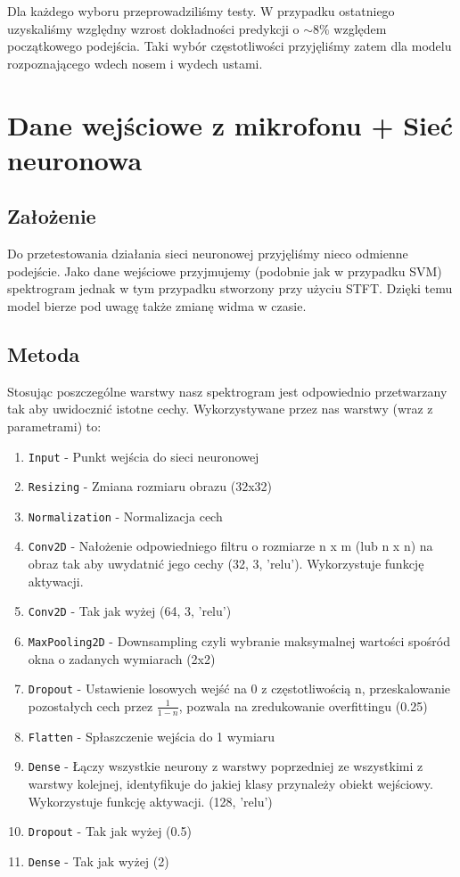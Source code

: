 \documentclass[polish]{article}
\begin{document}
Dla każdego wyboru przeprowadziliśmy testy. W przypadku ostatniego uzyskaliśmy względny wzrost dokładności predykcji o $\sim8\%$ względem początkowego podejścia. Taki wybór częstotliwości przyjęliśmy zatem dla modelu rozpoznającego wdech nosem i wydech ustami.

\section{Dane wejściowe z mikrofonu + Sieć neuronowa}
\subsection{Założenie}
Do przetestowania działania sieci neuronowej przyjęliśmy nieco odmienne podejście. Jako dane wejściowe przyjmujemy (podobnie jak w przypadku SVM) spektrogram jednak w tym przypadku stworzony przy użyciu STFT. Dzięki temu model bierze pod uwagę także zmianę widma w czasie.
\subsection{Metoda}
Stosując poszczególne warstwy nasz spektrogram jest odpowiednio przetwarzany tak aby uwidocznić istotne cechy. Wykorzystywane przez nas warstwy (wraz z parametrami) to:
\begin{enumerate}
  \item\texttt{Input} - Punkt wejścia do sieci neuronowej
  \item\texttt{Resizing} - Zmiana rozmiaru obrazu (32x32)
  \item\texttt{Normalization} - Normalizacja cech
  \item\texttt{Conv2D} - Nałożenie odpowiedniego filtru o rozmiarze n x m (lub n x n) na obraz tak aby uwydatnić jego cechy (32, 3, 'relu'). Wykorzystuje funkcję aktywacji.
  \item\texttt{Conv2D} - Tak jak wyżej (64, 3, 'relu')
  \item\texttt{MaxPooling2D} - Downsampling czyli wybranie maksymalnej wartości spośród okna o zadanych wymiarach (2x2)
  \item\texttt{Dropout} - Ustawienie losowych wejść na 0 z częstotliwością n, przeskalowanie pozostałych cech przez 
  $\frac{1}{1-n}$, pozwala na zredukowanie overfittingu (0.25)
  \item\texttt{Flatten} - Spłaszczenie wejścia do 1 wymiaru
  \item\texttt{Dense} - Łączy wszystkie neurony z warstwy poprzedniej ze wszystkimi z warstwy kolejnej, identyfikuje do jakiej klasy przynależy obiekt wejściowy. Wykorzystuje funkcję aktywacji. (128, 'relu')
  \item\texttt{Dropout} - Tak jak wyżej (0.5)
  \item\texttt{Dense} - Tak jak wyżej (2)
\end{enumerate}
\end{document}
